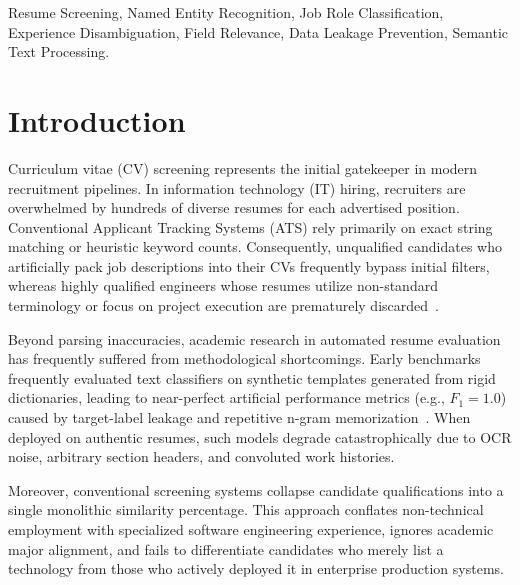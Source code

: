 \documentclass[conference]{IEEEtran}
\begin{document}
\begin{IEEEkeywords}
Resume Screening, Named Entity Recognition, Job Role Classification, Experience Disambiguation, Field Relevance, Data Leakage Prevention, Semantic Text Processing.
\end{IEEEkeywords}

\section{Introduction}
Curriculum vitae (CV) screening represents the initial gatekeeper in modern recruitment pipelines. In information technology (IT) hiring, recruiters are overwhelmed by hundreds of diverse resumes for each advertised position. Conventional Applicant Tracking Systems (ATS) rely primarily on exact string matching or heuristic keyword counts. Consequently, unqualified candidates who artificially pack job descriptions into their CVs frequently bypass initial filters, whereas highly qualified engineers whose resumes utilize non-standard terminology or focus on project execution are prematurely discarded~\cite{sackett2022revisiting}.

Beyond parsing inaccuracies, academic research in automated resume evaluation has frequently suffered from methodological shortcomings. Early benchmarks frequently evaluated text classifiers on synthetic templates generated from rigid dictionaries, leading to near-perfect artificial performance metrics (e.g., $F_1 = 1.0$) caused by target-label leakage and repetitive n-gram memorization~\cite{zhang2023job}. When deployed on authentic resumes, such models degrade catastrophically due to OCR noise, arbitrary section headers, and convoluted work histories.

Moreover, conventional screening systems collapse candidate qualifications into a single monolithic similarity percentage. This approach conflates non-technical employment with specialized software engineering experience, ignores academic major alignment, and fails to differentiate candidates who merely list a technology from those who actively deployed it in enterprise production systems.
\end{document}
